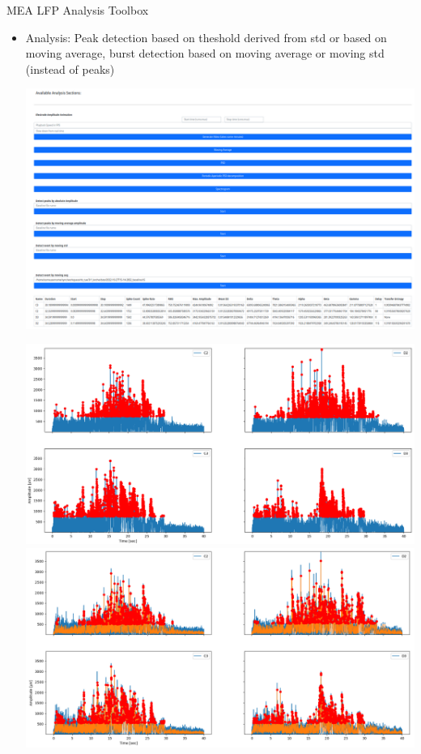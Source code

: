 \documentclass[10pt]{beamer}
\begin{document}
\begin{frame}[allowframebreaks]{MEA LFP Analysis Toolbox}
\begin{itemize}
\begin{center}
      \end{center}
      \framebreak
      
     \item Analysis: Peak detection based on theshold derived from std or based on moving average, burst detection based on moving average or moving std (instead of peaks) \\ [1em]
        \begin{center}
      \includegraphics[keepaspectratio,width=0.8\framewidth]{img/4_analyze.png}
      \end{center}
      \framebreak
      \hspace{-1cm}\includegraphics[keepaspectratio,width=\framewidth]{img/4_peaks_amplitude.png}
      \framebreak
      \hspace{-1cm}\includegraphics[keepaspectratio,width=\framewidth]{img/4_peaks_avg.png}

\end{itemize}
\end{frame}
\end{document}
